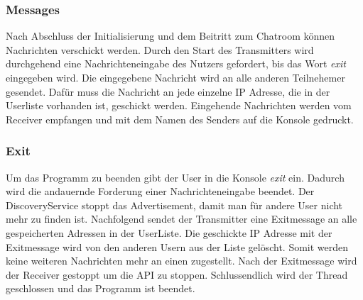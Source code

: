 \subsubsection{Messages}
Nach Abschluss der Initialisierung und dem Beitritt zum Chatroom können Nachrichten verschickt werden. Durch den Start des Transmitters wird durchgehend eine Nachrichteneingabe des Nutzers gefordert, 
bis das Wort \emph{exit} eingegeben wird.
Die eingegebene Nachricht wird an alle anderen Teilnehemer gesendet. Dafür muss die Nachricht an jede einzelne IP Adresse, die in der Userliste vorhanden ist, geschickt werden.
Eingehende Nachrichten werden vom Receiver empfangen und mit dem Namen des Senders auf die Konsole gedruckt. 

\subsubsection{Exit}
Um das Programm zu beenden gibt der User in die Konsole \emph{exit} ein. Dadurch wird die andauernde Forderung einer Nachrichteneingabe beendet.
Der DiscoveryService stoppt das Advertisement, damit man für andere User nicht mehr zu finden ist. Nachfolgend sendet der Transmitter eine Exitmessage 
an alle gespeicherten Adressen in der UserListe. Die geschickte IP Adresse mit der Exitmessage wird von den anderen Usern aus der Liste gelöscht. 
Somit werden keine weiteren Nachrichten mehr an einen zugestellt. Nach der Exitmessage wird der Receiver gestoppt um die API zu stoppen. 
Schlussendlich wird der Thread geschlossen und das Programm ist beendet. 